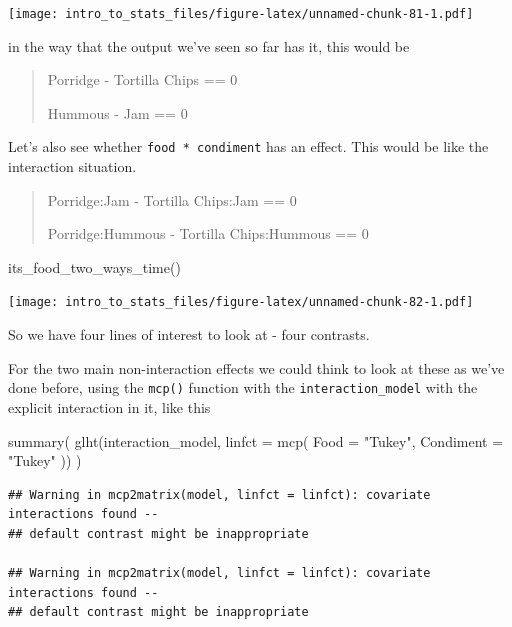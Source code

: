 \documentclass[
]{book}
\newenvironment{Shaded}{\begin{snugshade}}{\end{snugshade}}
\newcommand{\AttributeTok}[1]{\textcolor[rgb]{0.77,0.63,0.00}{#1}}
\newcommand{\FunctionTok}[1]{\textcolor[rgb]{0.00,0.00,0.00}{#1}}
\newcommand{\NormalTok}[1]{#1}
\newcommand{\StringTok}[1]{\textcolor[rgb]{0.31,0.60,0.02}{#1}}
\begin{document}
\texttt{[image: intro\_to\_stats\_files/figure-latex/unnamed-chunk-81-1.pdf]}

in the way that the output we've seen so far has it, this would be

\begin{quote}
Porridge - Tortilla Chips == 0

Hummous - Jam == 0
\end{quote}

Let's also see whether \texttt{food\ *\ condiment} has an effect. This would be like the interaction situation.

\begin{quote}
Porridge:Jam - Tortilla Chips:Jam == 0

Porridge:Hummous - Tortilla Chips:Hummous == 0
\end{quote}

\begin{Shaded}
\begin{Highlighting}[]
\FunctionTok{its\_food\_two\_ways\_time}\NormalTok{()}
\end{Highlighting}
\end{Shaded}

\texttt{[image: intro\_to\_stats\_files/figure-latex/unnamed-chunk-82-1.pdf]}

So we have four lines of interest to look at - four contrasts.

For the two main non-interaction effects we could think to look at these as we've done before, using the \texttt{mcp()} function with the \texttt{interaction\_model} with the explicit interaction in it, like this

\begin{Shaded}
\begin{Highlighting}[]
\FunctionTok{summary}\NormalTok{(}
  \FunctionTok{glht}\NormalTok{(interaction\_model, }\AttributeTok{linfct =} \FunctionTok{mcp}\NormalTok{(}
    \AttributeTok{Food =} \StringTok{"Tukey"}\NormalTok{,}
    \AttributeTok{Condiment =} \StringTok{"Tukey"}
\NormalTok{  ))}
\NormalTok{)}
\end{Highlighting}
\end{Shaded}

\begin{verbatim}
## Warning in mcp2matrix(model, linfct = linfct): covariate interactions found --
## default contrast might be inappropriate

## Warning in mcp2matrix(model, linfct = linfct): covariate interactions found --
## default contrast might be inappropriate
\end{verbatim}
\end{document}
